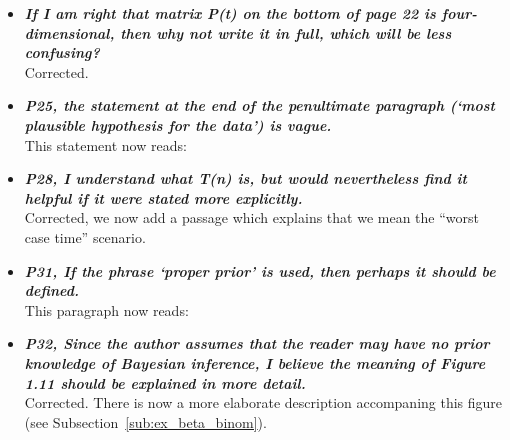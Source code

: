 \documentclass[english]{article}
\begin{document}
\begin{itemize}
\begin{quote}
\myeditsvsixtwo
\end{quote}



\item {
{\it
\textbf{
If I am right that matrix P(t) on the bottom of page 22 is four-dimensional, then why not write it in full, which will be less confusing?
}%
}%
}%
\\
Corrected.




\item {
{\it
\textbf{
P25, the statement at the end of the penultimate paragraph (`most plausible hypothesis for the data') is vague.
}%
}%
}%
\\
This statement now reads:

\begin{quote}
\myeditsveight
\end{quote}









\item {
{\it
\textbf{
P28, I understand what T(n) is, but would nevertheless find it helpful if it were stated more explicitly.
}%
}%
}%
\\
Corrected, we now add a passage which explains that we mean the ``worst case time'' scenario.


\item {
{\it
\textbf{
P31, If the phrase `proper prior' is used, then perhaps it should be defined.
}%
}%
}%
\\
This paragraph now reads:

\begin{quote}
\myeditsvnine
\end{quote}


\item {
{\it
\textbf{
P32, Since the author assumes that the reader may have no prior knowledge of Bayesian inference, I believe the meaning of Figure 1.11 should be explained in more detail.
}%
}%
}%
\\
Corrected. There is now a more elaborate description accompaning this figure (see Subsection~\ref{sub:ex_beta_binom}).




\end{itemize}
\end{document}

